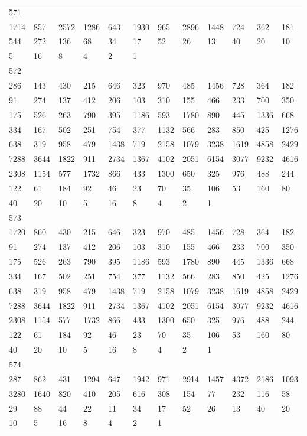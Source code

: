 \begin{longtable}{llllllllllll}
571&&&&&&&&&&&\\
1714& 857& 2572& 1286& 643& 1930& 965& 2896& 1448& 724& 362& 181\\
544& 272& 136& 68& 34& 17& 52& 26& 13& 40& 20& 10\\
5& 16& 8& 4& 2& 1& \\

572&&&&&&&&&&&\\
286& 143& 430& 215& 646& 323& 970& 485& 1456& 728& 364& 182\\
91& 274& 137& 412& 206& 103& 310& 155& 466& 233& 700& 350\\
175& 526& 263& 790& 395& 1186& 593& 1780& 890& 445& 1336& 668\\
334& 167& 502& 251& 754& 377& 1132& 566& 283& 850& 425& 1276\\
638& 319& 958& 479& 1438& 719& 2158& 1079& 3238& 1619& 4858& 2429\\
7288& 3644& 1822& 911& 2734& 1367& 4102& 2051& 6154& 3077& 9232& 4616\\
2308& 1154& 577& 1732& 866& 433& 1300& 650& 325& 976& 488& 244\\
122& 61& 184& 92& 46& 23& 70& 35& 106& 53& 160& 80\\
40& 20& 10& 5& 16& 8& 4& 2& 1& \\

573&&&&&&&&&&&\\
1720& 860& 430& 215& 646& 323& 970& 485& 1456& 728& 364& 182\\
91& 274& 137& 412& 206& 103& 310& 155& 466& 233& 700& 350\\
175& 526& 263& 790& 395& 1186& 593& 1780& 890& 445& 1336& 668\\
334& 167& 502& 251& 754& 377& 1132& 566& 283& 850& 425& 1276\\
638& 319& 958& 479& 1438& 719& 2158& 1079& 3238& 1619& 4858& 2429\\
7288& 3644& 1822& 911& 2734& 1367& 4102& 2051& 6154& 3077& 9232& 4616\\
2308& 1154& 577& 1732& 866& 433& 1300& 650& 325& 976& 488& 244\\
122& 61& 184& 92& 46& 23& 70& 35& 106& 53& 160& 80\\
40& 20& 10& 5& 16& 8& 4& 2& 1& \\

574&&&&&&&&&&&\\
287& 862& 431& 1294& 647& 1942& 971& 2914& 1457& 4372& 2186& 1093\\
3280& 1640& 820& 410& 205& 616& 308& 154& 77& 232& 116& 58\\
29& 88& 44& 22& 11& 34& 17& 52& 26& 13& 40& 20\\
10& 5& 16& 8& 4& 2& 1& \\


\end{longtable}
